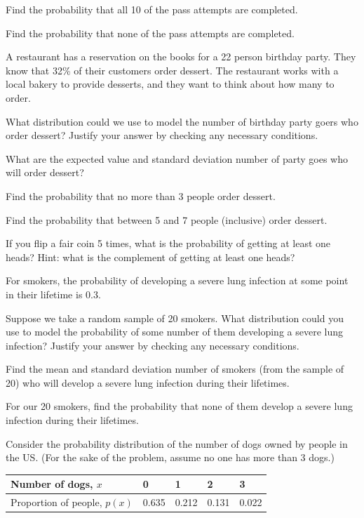 \documentclass[
]{book}
\begin{document}
Find the probability that all 10 of the pass attempts are completed.

Find the probability that none of the pass attempts are completed.

A restaurant has a reservation on the books for a 22 person birthday party. They know that 32\% of their customers order dessert. The restaurant works with a local bakery to provide desserts, and they want to think about how many to order.

What distribution could we use to model the number of birthday party goers who order dessert? Justify your answer by checking any necessary conditions.

What are the expected value and standard deviation number of party goes who will order dessert?

Find the probability that no more than 3 people order dessert.

Find the probability that between 5 and 7 people (inclusive) order dessert.

If you flip a fair coin 5 times, what is the probability of getting at least one heads? Hint: what is the complement of getting at least one heads?

For smokers, the probability of developing a severe lung infection at some point in their lifetime is 0.3.

Suppose we take a random sample of 20 smokers. What distribution could you use to model the probability of some number of them developing a severe lung infection? Justify your answer by checking any necessary conditions.

Find the mean and standard deviation number of smokers (from the sample of 20) who will develop a severe lung infection during their lifetimes.

For our 20 smokers, find the probability that none of them develop a severe lung infection during their
lifetimes.

Consider the probability distribution of the number of dogs owned by people in the US. (For the sake of the problem, assume no one has more than 3 dogs.)

\begin{longtable}[]{@{}lllll@{}}
\toprule\noalign{}
Number of dogs, \(x\) & 0 & 1 & 2 & 3 \\
\midrule\noalign{}
\endhead
\bottomrule\noalign{}
\endlastfoot
Proportion of people, \(p(x)\) & 0.635 & 0.212 & 0.131 & 0.022 \\
\end{longtable}
\end{document}
